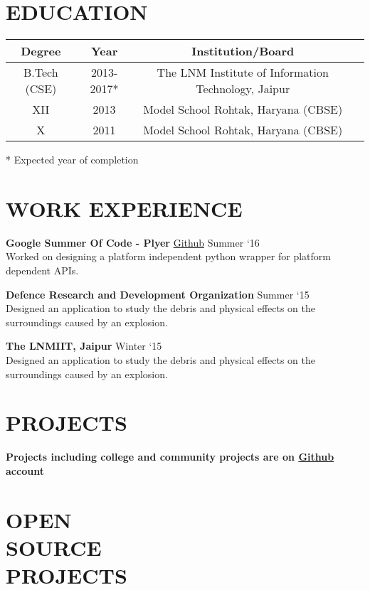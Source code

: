 \documentclass[margin]{res}
\begin{document}
\begin{resume}

\section{EDUCATION}

\begin{tabular}{|c|c|c|c|}

\hline
\textbf{Degree} & \textbf{Year} & {Institution/Board} \\
\hline
B.Tech (CSE) & 2013-2017* & The LNM Institute of Information Technology, Jaipur \\
\hline
XII & 2013 & Model School Rohtak, Haryana (CBSE) \\
\hline
X & 2011 & Model School Rohtak, Haryana (CBSE) \\
\hline
\end{tabular}
* Expected year of completion

\section{WORK EXPERIENCE}
\textbf{Google Summer Of Code - Plyer}   \href{https://github.com/kiok46/plyer}{Github} \hfill Summer `16 \\
Worked on designing a platform independent python wrapper for platform dependent APIs.

\textbf{Defence Research and Development Organization} \hfill Summer `15 \\
Designed an application to study the debris and physical effects on the surroundings caused by an explosion.

\textbf{The LNMIIT, Jaipur} \hfill Winter `15 \\
Designed an application to study the debris and physical effects on the surroundings caused by an explosion.

\section{PROJECTS}

     \textbf{Projects including college and community projects are on \href{https://github.com/kiok46}{Github} account}

\section{OPEN \\SOURCE \\PROJECTS}


\end{resume}
\end{document}
